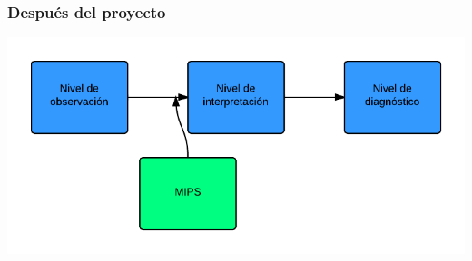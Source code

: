 \begin{frame}
	\frametitle{Despu\'es del proyecto}
	\includegraphics[width=1.0\linewidth]{./Figures/DespuesDelProyecto.png}
	
\end{frame}